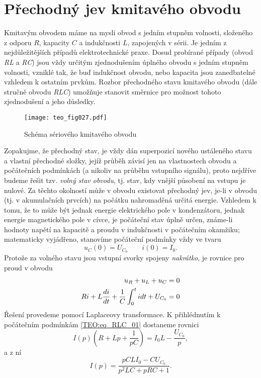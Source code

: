  \section{Přechodný jev kmitavého obvodu}
    Kmitavým obvodem máme na mysli obvod s jedním stupněm volnosti, složeného z odporu $R$,
    kapacity $C$ a indukčnosti $L$, zapojených v sérii. Je jedním z nejdůležitějších případů
    elektrotechnické praxe. Dosud probírané případy (obvod \emph{RL} a \emph{RC}) jsou vždy určitým
    zjednodušením úplného obvodu s jedním stupněm volnosti, vzniklé tak, že buď indukčnost obvodu,
    nebo kapacita jsou zanedbatelné vzhledem k ostatním prvkům. Rozbor přechodného stavu kmitavého
    obvodu (dále stručně obvodu \emph{RLC}) umožňuje stanovit směrnice pro možnost tohoto
    zjednodušení a jeho důsledky.
    \begin{wrapfigure}{r}{7cm}
      \centering
      \texttt{[image: teo\_fig027.pdf]}
      \caption[Schéma sériového kmitavého obvodu]{Schéma sériového kmitavého obvodu}
      \label{teo:fig027}
    \end{wrapfigure}
    Zopakujme, že přechodný stav, je vždy dán superpozicí nového ustáleného stavu a vlastní 
    přechodné složky, jejíž průběh závisí jen na vlastnostech obvodu a počátečních podmínkách (a 
    nikoliv na průběhu vstupního signálu), proto nejdříve budeme řešit tzv. \emph{volný stav 
    obvodu}, tj. stav, kdy vnější působení na vstupu je nulové. Za těchto okolností může v obvodu 
    existovat přechodný jev, je-li v obvodu (tj. v akumulačních prvcích) na počátku nahromaděná 
    určitá energie. Vzhledem k tomu, že to může být jednak energie elektrického pole v 
    kondenzátoru, jednak energie magnetického pole v cívce, je počáteční stav úplně určen, známe-li 
    hodnoty napětí na kapacitě a proudu v indukčnosti v počátečním okamžiku; matematicky vyjádřeno, 
    stanovíme počáteční podmínky vždy ve tvaru
    \begin{equation}\label{TEO:eq_RLC_00}
      u_C(0) = U_{C_0} \qquad i(0) = I_0.
    \end{equation}    
    Protože za volného stavu jsou vstupní svorky spojeny \emph{nakrátko}, je rovnice pro proud v
    obvodu
    \begin{align}\label{TEO:eq_RLC_01}
       u_R + u_L + u_C                                    &= 0 \\
       Ri + L\dfrac{d i}{d t} +\frac{1}{C}\int_0^tidt + U_{C_0} &= 0
    \end{align}     
    Řešení provedeme pomocí Laplaceovy transformace. K přihlédnutím  k počátečním podmínkám
    \ref{TEO:eq_RLC_01} dostaneme rovnici
    \begin{equation}\label{TEO:eq_RLC_02}
      I(p)(R + Lp + \frac{1}{pC}) = I_0L - \frac{U_{C_0}}{p},
    \end{equation}     
    a z ní 
    \begin{equation}\label{TEO:eq_RLC_03}
      I(p) = \frac{pCLI_0 - CU_{C_0}}{p^2LC + pRC + 1}.
    \end{equation}

\printbibliography[title={Seznam literatury}, heading=subbibliography]
